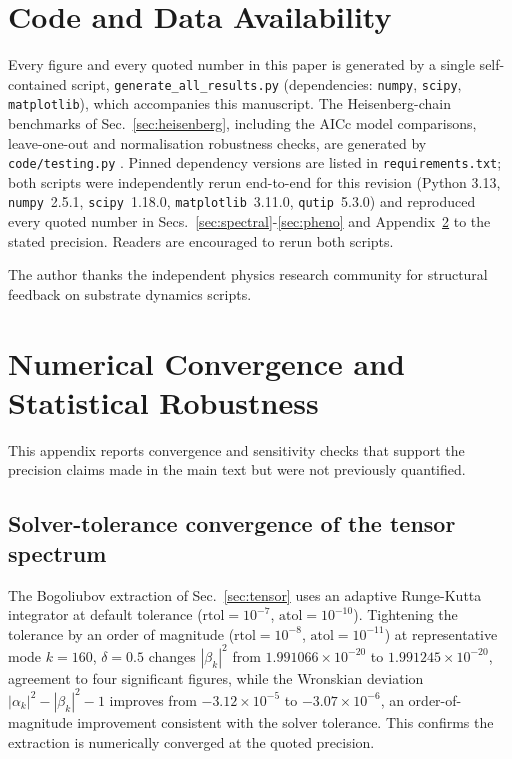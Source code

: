 \documentclass[reprint,superscriptaddress,amsmath,amssymb,aps,prd,showkeys,nofootinbib]{revtex4-2}
\begin{document}
\section{Code and Data Availability}
\label{sec:code}

Every figure and every quoted number in this paper is generated by a single self-contained
script, \texttt{generate\_all\_results.py} (dependencies: \texttt{numpy}, \texttt{scipy},
\texttt{matplotlib}), which accompanies this manuscript. The Heisenberg-chain benchmarks of
Sec.~\ref{sec:heisenberg}, including the AICc model comparisons, leave-one-out and
normalisation robustness checks, are generated by \texttt{code/testing.py} \cite{CodeRepo}.
Pinned dependency versions are listed in \texttt{requirements.txt}; both scripts were
independently rerun end-to-end for this revision (Python 3.13, \texttt{numpy}~2.5.1,
\texttt{scipy}~1.18.0, \texttt{matplotlib}~3.11.0, \texttt{qutip}~5.3.0) and reproduced every
quoted number in Secs.~\ref{sec:spectral}-\ref{sec:pheno} and Appendix~\ref{app:numerics} to
the stated precision. Readers are encouraged to rerun both scripts.

\begin{acknowledgements}
The author thanks the independent physics research community for structural feedback on
substrate dynamics scripts.
\end{acknowledgements}

\appendix

\section{Numerical Convergence and Statistical Robustness}
\label{app:numerics}

This appendix reports convergence and sensitivity checks that support the precision claims
made in the main text but were not previously quantified.

\subsection{Solver-tolerance convergence of the tensor spectrum}
\label{app:tensor-tol}
The Bogoliubov extraction of Sec.~\ref{sec:tensor} uses an adaptive Runge-Kutta integrator
at default tolerance ($\mathrm{rtol}=10^{-7}$, $\mathrm{atol}=10^{-10}$). Tightening the
tolerance by an order of magnitude ($\mathrm{rtol}=10^{-8}$, $\mathrm{atol}=10^{-11}$) at
representative mode $k=160$, $\delta=0.5$ changes $|\beta_k|^2$ from $1.991066\times10^{-20}$
to $1.991245\times10^{-20}$, agreement to four significant figures, while the Wronskian
deviation $|\alpha_k|^2-|\beta_k|^2-1$ improves from $-3.12\times10^{-5}$ to
$-3.07\times10^{-6}$, an order-of-magnitude improvement consistent with the solver
tolerance. This confirms the extraction is numerically converged at the quoted precision.
\end{document}
